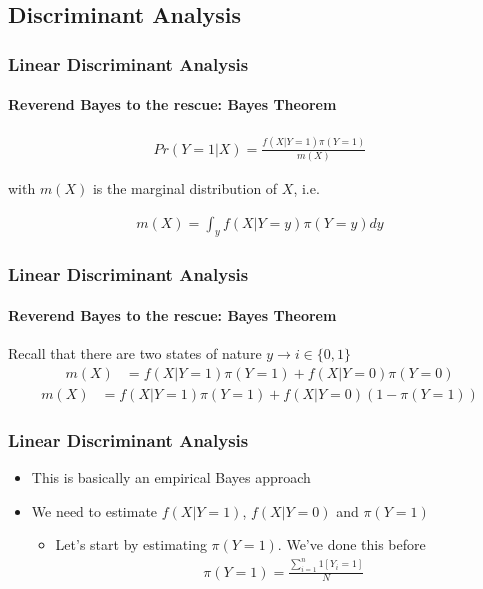 \documentclass[
  shownotes,
  xcolor={svgnames},
  hyperref={colorlinks,citecolor=DarkBlue,linkcolor=andesred,urlcolor=DarkBlue}
  , aspectratio=169]{beamer}
\begin{document}
\subsection{Discriminant Analysis}
\begin{frame}[fragile]
\frametitle{Linear Discriminant Analysis}
\framesubtitle{Reverend Bayes to the rescue: Bayes Theorem}

\bigskip
\begin{align}
Pr (Y=1|X)=\frac{f(X|Y=1)\pi(Y=1)}{m(X)}
\end{align}

\bigskip
with $m(X)$ is the marginal distribution of $X$, i.e.

\begin{align}
m(X)=\int_y f(X|Y=y)\pi(Y=y)dy
\end{align}
\end{frame}
\begin{frame}[fragile]
\frametitle{Linear Discriminant Analysis}
\framesubtitle{Reverend Bayes to the rescue: Bayes Theorem}

Recall that there are two states of nature $y \rightarrow i\in\{0,1\}$
\bigskip
\begin{align}
m(X) &= f(X|Y=1)\pi(Y=1) + f(X|Y=0)\pi(Y=0) 
\end{align}
\medskip
\begin{align}
m(X)     &= f(X|Y=1)\pi(Y=1) + f(X|Y=0)(1-\pi(Y=1))
\end{align}

\end{frame}
\begin{frame}[fragile]
\frametitle{Linear Discriminant Analysis}
\begin{itemize}
  \item This is basically an empirical Bayes approach
  \medskip
  \item We need to estimate $f(X|Y=1)$,  $f(X|Y=0)$ and $\pi(Y=1)$ 
  \medskip
  \begin{itemize}
    \item Let's start by estimating $\pi(Y=1)$. We've done this before
    \medskip
    \begin{align}
    \pi(Y=1) = \frac{\sum_{i=1}^n 1[Y_i=1]}{N}
    \end{align}

      \end{itemize}
\end{itemize}
\end{frame}
\end{document}

